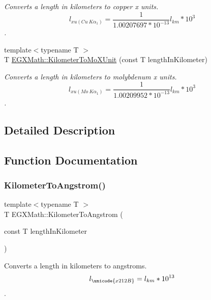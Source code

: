 \begin{DoxyCompactItemize}
\begin{DoxyCompactList}\small\item\em Converts a length in kilometers to copper x units. \[ l_{xu(Cu\ K\alpha_1)}= \frac{1}{1.00207697*10^{-13}} l_{km} * 10^{3}\]. \end{DoxyCompactList}\item 
{\footnotesize template$<$typename T $>$ }\\T \mbox{\hyperlink{group___e_g_x_math-_conversions-_length_conversions-_kilometer-_non-_s_i_ga547782594ebd0cc3e565f6d32f9528df}{E\+G\+X\+Math\+::\+Kilometer\+To\+Mo\+X\+Unit}} (const T length\+In\+Kilometer)
\begin{DoxyCompactList}\small\item\em Converts a length in kilometers to molybdenum x units. \[ l_{xu(Mo\ K\alpha_1)}=\frac{1}{1.00209952*10^{-13}} l_{km} * 10^{3}\]. \end{DoxyCompactList}\end{DoxyCompactItemize}


\subsection{Detailed Description}


\subsection{Function Documentation}
\mbox{\label{group___e_g_x_math-_conversions-_length_conversions-_kilometer-_non-_s_i_ga415a412a1b03916d6071a206a3318035}} 
\subsubsection{\texorpdfstring{Kilometer\+To\+Angstrom()}{KilometerToAngstrom()}}
{\footnotesize\ttfamily template$<$typename T $>$ \\
T E\+G\+X\+Math\+::\+Kilometer\+To\+Angstrom (\begin{DoxyParamCaption}\item[{const T}]{length\+In\+Kilometer }\end{DoxyParamCaption})}



Converts a length in kilometers to angstroms. \[ l_{\unicode{x212B}}=l_{km} * 10^{13} \]. 

